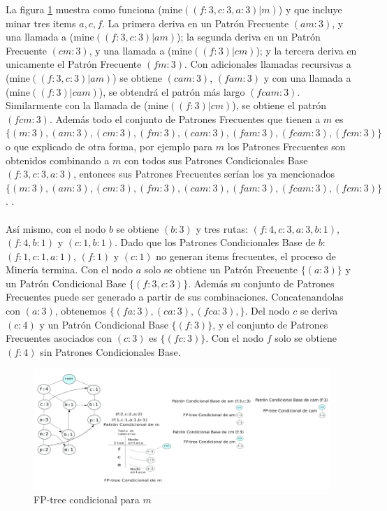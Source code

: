 La figura \ref{fpcondicional} muestra como funciona (mine$((f:3,c:3,a:3)|m)$) y que incluye minar tres items
$a, c, f$. La primera deriva en un Patr\'on Frecuente $(am:3)$, y una llamada a (mine$((f:3,c:3)|am)$); 
la segunda deriva en un Patr\'on Frecuente $(cm:3)$, y una llamada a (mine$((f:3)|cm)$); y la tercera deriva en
unicamente el Patr\'on Frecuente $(fm:3)$. Con adicionales llamadas recursivas a (mine$((f:3,c:3)|am)$) se obtiene
$(cam:3)$, $(fam:3)$ y con una llamada a (mine$((f:3)|cam)$), se obtendr\'a el patr\'on m\'as largo $(fcam:3)$. 
Similarmente con la llamada de (mine$((f:3)|cm)$), se obtiene el patr\'on $(fcm:3)$. Adem\'as todo el conjunto de 
Patrones Frecuentes que tienen a $m$ es $\{(m:3),(am:3),(cm:3),(fm:3),(cam:3),(fam:3),(fcam:3),(fcm:3)\}$ o que 
explicado de otra forma, por ejemplo para $m$ los Patrones Frecuentes son obtenidos combinando a $m$ con todos 
sus Patrones Condicionales Base $(f:3,c:3,a:3)$, entonces sus Patrones Frecuentes ser\'ian los ya mencionados
$\{(m:3),(am:3),(cm:3),(fm:3),(cam:3),(fam:3),(fcam:3),(fcm:3)\}$.
.\\ \\
As\'i mismo, con el nodo $b$ se obtiene $(b:3)$ y tres rutas: $(f:4,c:3,a:3,b:1)$, $(f:4,b:1)$ y $(c:1,b:1)$. Dado
que los Patrones Condicionales Base de $b$: $(f:1,c:1,a:1)$, $(f:1)$ y $(c:1)$ no generan items frecuentes, el 
proceso de Miner\'ia termina. Con el nodo $a$ solo se obtiene un Patr\'on Frecuente $\{(a:3)\}$ y un Patr\'on
Condicional Base $\{(f:3,c:3)\}$. Adem\'as su conjunto de Patrones Frecuentes puede ser generado a partir de sus
combinaciones. Concatenandolas con $(a:3)$, obtenemos $\{(fa:3),(ca:3),(fca:3),\}$. Del nodo $c$ se deriva
$(c:4)$ y un Patr\'on Condicional Base $\{(f:3)\}$, y el conjunto de Patrones Frecuentes asociados con $(c:3)$ es
$\{(fc:3)\}$. Con el nodo $f$ solo se obtiene $(f:4)$ sin Patrones Condicionales Base.\\

\begin{figure}[t]
   \centering
   \includegraphics[width=1\textwidth]{images/fpcondicional.png}
   \caption{FP-tree condicional para $m$}
   \label{fpcondicional}
\end{figure}

